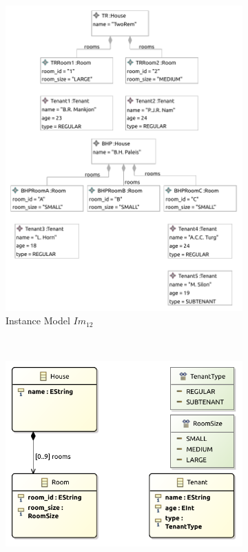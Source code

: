 \begin{figure}[p]
    \centering
    \begin{subfigure}{0.98\textwidth}
        \centering
        \includegraphics{images/06_application/instance_model/step12.pdf}
        \caption{Instance Model $Im_{12}$}
        \label{fig:application:building_the_model:tenant_types:ecore:instance_model}
    \end{subfigure}
    \\
    \begin{subfigure}{0.98\textwidth}
        \centering
        \includegraphics{images/06_application/type_model/step12.pdf}

\end{subfigure}
\end{figure}
